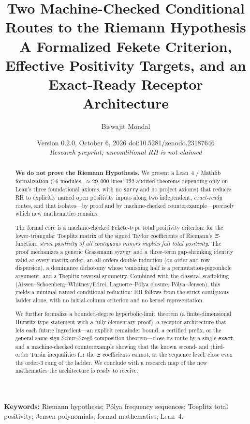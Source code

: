 \documentclass[11pt,a4paper]{article}
\title{\bfseries\Large Two Machine-Checked Conditional Routes to the Riemann Hypothesis\\[0.35em]
\large A Formalized Fekete Criterion, Effective Positivity Targets, and an Exact-Ready Receptor Architecture}
\author{Biswajit Mondal}
\date{\small Version 0.2.0, October 6, 2026 \quad doi:10.5281/zenodo.23187646\\[0.25em]
\textit{Research preprint; unconditional RH is not claimed}}
\theoremstyle{definition}
\begin{document}
\maketitle

\begin{abstract}
\noindent\textbf{We do not prove the Riemann Hypothesis.}  We present a
Lean~4 / Mathlib formalization (76 modules, $\approx 29{,}000$ lines,
122 audited theorems depending only on Lean's three foundational axioms, with
no \texttt{sorry} and no project axioms) that reduces RH to explicitly named
open positivity inputs along two independent, \emph{exact-ready} routes, and
that isolates---by proof and by machine-checked counterexample---precisely
which new mathematics remains.

The formal core is a machine-checked Fekete-type total positivity criterion:
for the lower-triangular Toeplitz
matrix of the signed Taylor coefficients of Riemann's $\Xi$-function,
\emph{strict positivity of all contiguous minors implies full total
positivity}.  The proof mechanizes a generic Grassmann syzygy and a
three-term gap-shrinking identity valid at every matrix order, an all-orders
double induction (on order and row dispersion), a dominance dichotomy whose
vanishing half is a permutation-pigeonhole argument, and a Toeplitz reversal
symmetry.  Combined with the classical scaffolding
(Aissen--Schoenberg--Whitney/Edrei, Laguerre--P\'olya closure,
P\'olya--Jensen), this yields a minimal named conditional reduction: RH
follows from the strict contiguous ladder alone,
with no initial-column criterion and no kernel representation.

We further formalize a bounded-degree hyperbolic-limit theorem (a
finite-dimensional Hurwitz-type statement with a fully elementary proof), a
receptor architecture that lets each future ingredient---an explicit
remainder bound, a certified prefix, or the general same-sign
Schur--Szeg\H{o} composition theorem---close its route by a single
\texttt{exact}, and a machine-checked counterexample showing that the known
second- and third-order Tur\'an inequalities for the $\Xi$ coefficients
cannot, at the sequence level, close even the order-$3$ rung of the ladder.
We conclude with a research map of the new mathematics the architecture is
ready to receive.
\end{abstract}

\noindent\textbf{Keywords:} Riemann hypothesis; P\'olya frequency sequences;
Toeplitz total positivity; Jensen polynomials; formal mathematics; Lean~4.
\end{document}
